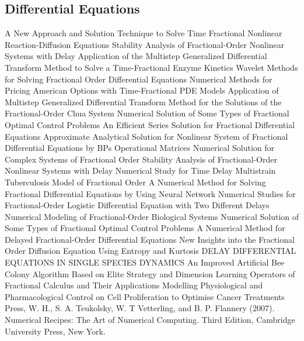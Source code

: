 \begin{thebibliography}{00}
\subsection{Differential Equations}

A New Approach and Solution Technique to Solve Time Fractional Nonlinear Reaction-Diffusion Equations
Stability Analysis of Fractional-Order Nonlinear Systems with Delay
Application of the Multistep Generalized Differential Transform Method to Solve a Time-Fractional Enzyme Kinetics
Wavelet Methods for Solving Fractional Order Differential Equations
Numerical Methods for Pricing American Options with Time-Fractional PDE Models
Application of Multistep Generalized Differential Transform Method for the Solutions of the Fractional-Order Chua System
Numerical Solution of Some Types of Fractional Optimal Control Problems
An Efficient Series Solution for Fractional Differential Equations
Approximate Analytical Solution for Nonlinear System of Fractional Differential Equations by BPs Operational Matrices
Numerical Solution for Complex Systems of Fractional Order
Stability Analysis of Fractional-Order Nonlinear Systems with Delay
Numerical Study for Time Delay Multistrain Tuberculosis Model of Fractional Order
A Numerical Method for Solving Fractional Differential Equations by Using Neural Network
Numerical Studies for Fractional-Order Logistic Differential Equation with Two Different Delays
Numerical Modeling of Fractional-Order Biological Systems
Numerical Solution of Some Types of Fractional Optimal Control Problems
A Numerical Method for Delayed Fractional-Order Differential Equations
 New Insights into the Fractional Order Diffusion Equation Using Entropy and Kurtosis
 DELAY DIFFERENTIAL EQUATIONS IN SINGLE SPECIES DYNAMICS
 An Improved Artificial Bee Colony Algorithm Based on Elite Strategy and Dimension Learning
Operators of Fractional Calculus and Their Applications
 Modelling Physiological and Pharmacological Control on Cell Proliferation to Optimise Cancer Treatments
Press, W. H., S. A. Teukolsky, W. T Vetterling, and B. P. Flannery (2007). 
\newblock Numerical Recipes: The Art of Numerical Computing. 
\newblock Third Edition, Cambridge University Press, New York.


\end{thebibliography}
